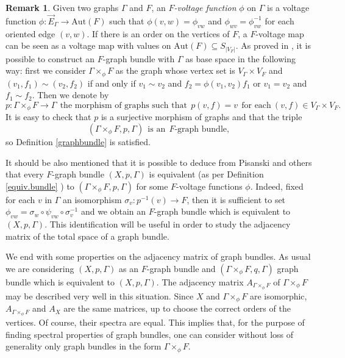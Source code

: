 \documentclass{amsart}
\theoremstyle{definition}
\newtheorem{rem}[theo]{Remark}
\numberwithin{equation}{section}
\begin{document}
\begin{rem}\label{exem0}
Given two graphs $\Gamma$ and $F$, an $F$\textit{-voltage function} $\phi$ on $\Gamma$ is a voltage function $\phi: \vec{E}_\Gamma \longrightarrow \mathrm{Aut}(F)$ such that $\phi(v,w) = \phi_{vw}$ and $\phi_{wv}=\phi_{vw}^{-1}$ for each oriented edge $(v,w)$. If there is an order on the vertices of $F$, a $F$-voltage map can be seen as a voltage map with values on $\mathrm{Aut}(F) \subseteq S_{\vert V_F \vert}$.
As proved in \cite{Pisanski}, it is possible to construct an $F$-graph bundle with $\Gamma$ as base space in the following way:  first we consider  $\Gamma \times_\phi F$ as the graph whose vertex set is $V_\Gamma \times V_F$ and $(v_1, f_1) \sim (v_2, f_2)$ if and only if $v_1 \sim v_2$ and $f_2 = \phi(v_1, v_2)f_1$ or $v_1 = v_2$ and $f_1 \sim f_2$. Then we
 denote by 
 \begin{equation}\label{fiberproduct1} p: \Gamma \times_{\phi} F \longrightarrow \Gamma  \ \ \mbox{the morphism of graphs such that} \   \  p(v,f) = v  \  \ \mbox{for each} \  (v,f) \in V_\Gamma \times V_F.
 \end{equation} 
 It is easy to check that $p$ is a surjective morphism of graphs and that the triple \begin{equation}\label{fiberproduct2}
 (\Gamma \times_\phi F, p, \Gamma) \ \  \mbox{is an}  \ \ F\mbox{-graph bundle},\end{equation} 
 so Definition \ref{graphbundle} is satisfied.
 
 
 It should be also mentioned that it is possible to deduce from Pisanski and others \cite{kwak, Pisanski}  that every $F$-graph bundle $(X, p, \Gamma)$ is equivalent (as per Definition \ref{equiv.bundle} ) to $(\Gamma \times_\phi F, p, \Gamma)$ for some $F$-voltage functions $\phi$. Indeed, fixed for each $v$ in $\Gamma$ an isomorphism $\sigma_v: p^{-1}(v) \longrightarrow F$, then it is sufficient to set $\phi_{vw} = \sigma_w \circ \psi_{vw} \circ \sigma_v^{-1}$ and we obtain an $F$-graph bundle which is equivalent to $(X, p, \Gamma)$. This identification will be useful in order to study the adjacency matrix of the total space of a graph bundle.
\end{rem}


We end with some properties on the adjacency matrix of graph bundles.  As usual we are considering $(X, p, \Gamma)$ as an  $F$-graph bundle and  $(\Gamma \times_{\phi} F, q, \Gamma)$  graph bundle which is equivalent to $(X, p, \Gamma)$. The adjacency matrix $A_{\Gamma \times_{\phi} F}$ of $\Gamma \times_{\phi} F$ may be  described very well in this situation. Since $X$ and $\Gamma \times_{\phi} F$ are isomorphic,  $A_{\Gamma \times_{\phi} F}$ and $A_X$ are the same matrices, up to choose the correct orders of the vertices. Of course, their spectra are equal. This implies that, for the purpose of finding spectral properties of graph bundles, one can consider without loss of generality only graph bundles in the form $\Gamma \times_{\phi} F$.
\end{document}
